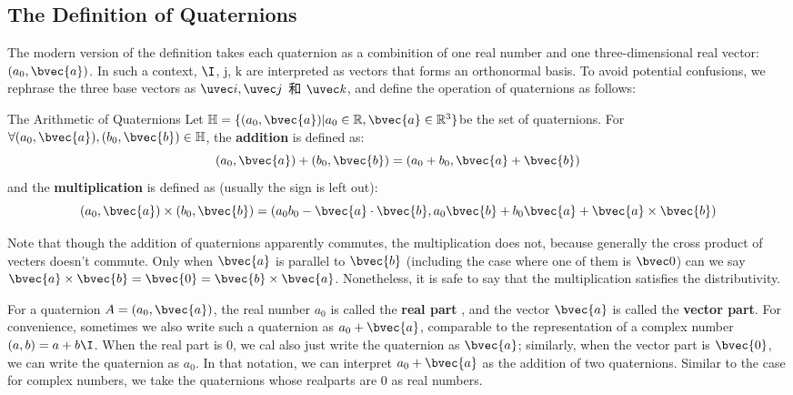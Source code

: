 \subsection{The Definition of Quaternions}

The modern version of the definition takes each quaternion as a combinition of one real number and one three-dimensional real vector: $(a_0, \bvec{a})$. In such a context, $\I$, $\mathrm{j}$, $\mathrm{k}$ are interpreted as vectors that forms an orthonormal basis. To avoid potential confusions, we rephrase the three base vectors as $\uvec i, \uvec j$ 和 $\uvec k$, and define the operation of quaternions as follows: 



\begin{definition}{The Arithmetic of Quaternions}
Let $\mathbb{H}=\{(a_0, \bvec{a})|a_0\in\mathbb{R}, \bvec{a}\in\mathbb{R}^3\}$be the set of quaternions. For $\forall(a_0, \bvec{a}), (b_0, \bvec{b})\in\mathbb{H}$, the \textbf{addition} is defined as:
\begin{equation}
(a_0, \bvec{a})+ (b_0, \bvec{b})=(a_0+b_0, \bvec{a}+\bvec{b})
\end{equation}
and the \textbf{multiplication} is defined as (usually the sign is left out):
\begin{equation}\label{QuaRot_eq1}
(a_0, \bvec{a})\times (b_0, \bvec{b})=(a_0b_0-\bvec{a}\cdot\bvec{b}, a_0\bvec{b}+b_0\bvec{a}+\bvec{a}\times\bvec{b})
\end{equation}
\end{definition}


Note that though the addition of quaternions apparently commutes, the multiplication does not, because generally the cross product of vecters doesn't commute. Only when $\bvec{a}$ is parallel to $\bvec{b}$ (including the case where one of them is $\bvec 0$) can we say $\bvec{a}\times\bvec{b}= \bvec{0} =\bvec{b}\times\bvec{a}$. Nonetheless, it is safe to say that the multiplication satisfies the distributivity. 



For a quaternion $A=(a_0, \bvec{a})$, the real number $a_0$ is called the \textbf{real part} , and the vector $\bvec{a}$ is called the \textbf{vector part}. For convenience, sometimes we also write such a quaternion as $a_0+\bvec{a}$, comparable to the representation of a complex number $(a, b)=a+b\I$. When the real part is $0$, we cal also just write the quaternion as $\bvec{a}$; similarly, when the vector part is $\bvec{0}$, we can write the quaternion as $a_0$. In that notation, we can interpret $a_0+\bvec{a}$ as the addition of two quaternions. Similar to the case for complex numbers, we take the quaternions whose realparts are $0$ as real numbers. 


